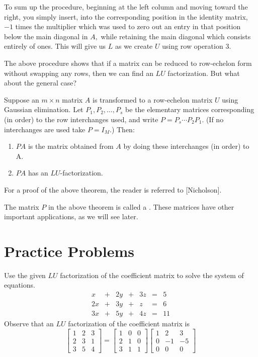 \documentclass{ximera}
\begin{document}
To sum up the procedure, beginning at the left column and moving toward the right, you
simply insert, into the corresponding position in the identity matrix, $-1$
times the multiplier which was used to zero out an entry in that position
below the main diagonal in $A,$ while retaining the main diagonal which
consists entirely of ones. This will give us $L$ as we create $U$ using row operation 3.

The above procedure shows that if a matrix can be reduced to row-echelon form without swapping any rows, then we can find an $LU$ factorization.  But what about the general case?

\begin{theorem}\label{th:LUPA}
Suppose an $m \times n$ matrix $A$ is transformed to a row-echelon matrix $U$ using Gaussian elimination. Let $P_1, P_2, \ldots, P_s$ be the elementary matrices corresponding (in order) to the row interchanges used,
and write $P=P_s \cdots P_2 P_1$. (If no interchanges are used take $P = I_M$.) Then:
\begin{enumerate}
\item $PA$ is the matrix obtained from $A$ by doing these interchanges (in order) to A.
\item $PA$ has an $LU$-factorization.
\end{enumerate}
\end{theorem}

For a proof of the above theorem, the reader is referred to [Nicholson].

The matrix $P$ in the above theorem is called a .  These matrices have other important applications, as we will see later.


\section*{Practice Problems}

\begin{problem}\label{prob:LU1}
Use the given $LU$ factorization of the coefficient matrix to solve the system of equations.
$$\begin{array}{ccccccc}
      x & +&2y&+&3z&= &5 \\
	 2x&+&3y&+&z&=&6\\
     3x& +&5y&+&4z&=&11
    \end{array}$$
Observe that an $LU$ factorization of the coefficient matrix is
\[
\begin{bmatrix}
1 & 2 & 3 \\
2 & 3 & 1 \\
3 & 5 & 4\end{bmatrix}
=
\begin{bmatrix}
1 & 0 & 0 \\
2 & 1 & 0 \\
3 & 1 & 1
\end{bmatrix} 
\begin{bmatrix}
1 & 2 & 3 \\
0 & -1 & -5 \\
0 & 0 & 0
\end{bmatrix}
\]
\end{problem}
\end{document}
